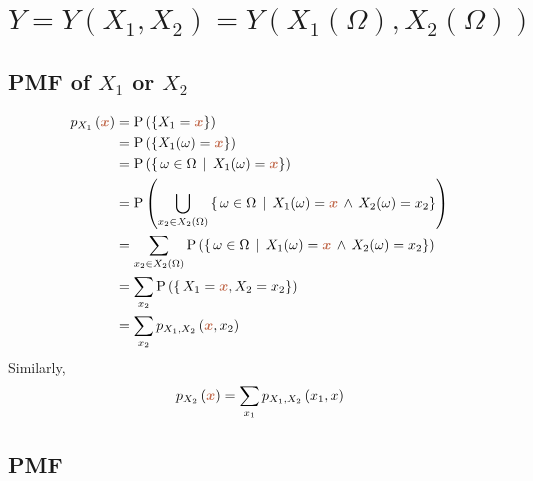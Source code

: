 \documentclass{article}
\DeclareRobustCommand{\myRandV}[1]{#1} %
\newcommand{\myPMF}[2]{p_{#1}\left(#2\right)}
\newcommand{\myP}[1]{\operatorname{P}\left(#1\right)} %
\newcommand{\myParam}[1]{\textcolor{myParamColor}{\bm{#1}}}
\begin{document}
\newpage

\section{$Y = Y(X_1, X_2) = Y(X_1(\Omega), X_2(\Omega))$}
\subsection{PMF of $\myRandV{X_1}$ or $\myRandV{X_2}$}


\begin{equation*}
\begin{aligned}
    \myPMF{\myRandV{X_1}}{\myParam{x}} &= \myP{\{\myRandV{X_1} = \myParam{x}\}} \\
    &= \myP{\left\{\myRandV{X_1}(\myRandV{\omega}) = \myParam{x} \right\}} \\
    &= \myP{\left\{\, \omega \in \Omega \, \mid \, \myRandV{X_1}(\omega) = \myParam{x}\right\}} \\
    &= \myP{ \bigcup_{x_2 \in \myRandV{X_2}(\Omega)} \left\{\, \omega \in \Omega \, \mid \, \myRandV{X_1}(\omega) = \myParam{x} \, \land \, \myRandV{X_2}(\omega) = x_2 \right\}} \\
    &= \sum_{x_2 \in \myRandV{X_2}(\Omega)} \myP{ \left\{\, \omega \in \Omega \, \mid \, \myRandV{X_1}(\omega) = \myParam{x} \, \land \, \myRandV{X_2}(\omega) = x_2 \right\}} \\
    &= \sum_{x_2} \myP{ \left\{\, \myRandV{X_1} = \myParam{x}, \myRandV{X_2} = x_2 \right\}} \\
    &= \sum_{x_2} \myPMF{\myRandV{X_1}, \myRandV{X_2}}{\myParam{x}, x_2}
\end{aligned}
\end{equation*}
Similarly, \begin{equation*}
    \myPMF{\myRandV{X_2}}{\myParam{x}} = \sum_{x_1} \myPMF{\myRandV{X_1}, \myRandV{X_2}}{x_1, x}
\end{equation*}

\subsection{PMF}
\end{document}

